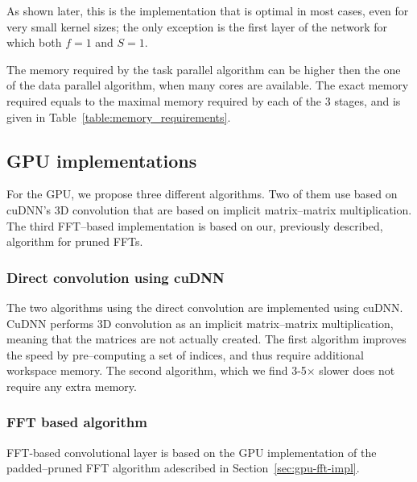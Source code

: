 \documentclass[conference]{./IEEEtran/IEEEtran}
\begin{document}
  As shown later, this is the implementation that is optimal in most
  cases, even for very small kernel sizes; the only exception is the
  first layer of the network for which both $f = 1$ and $S = 1$.

  The memory required by the task parallel algorithm can be higher
  then the one of the data parallel algorithm, when many cores are
  available.  The exact memory required equals to the maximal memory
  required by each of the 3 stages, and is given in
  Table~\ref{table:memory_requirements}.


\subsection{GPU implementations}

  For the GPU, we propose three different algorithms.  Two of them use
  based on cuDNN's 3D convolution that are based on implicit
  matrix--matrix multiplication.  The third FFT--based implementation
  is based on our, previously described, algorithm for pruned
  FFTs.

\subsubsection{Direct convolution using cuDNN}

  The two algorithms using the direct convolution are implemented
  using cuDNN.  CuDNN performs 3D convolution as an implicit
  matrix--matrix multiplication, meaning that the matrices are not
  actually created.  The first algorithm improves the speed by
  pre--computing a set of indices, and thus require additional
  workspace memory.  The second algorithm, which we find 3-5$\times$
  slower does not require any extra memory.

\subsubsection{FFT based algorithm}

  FFT-based convolutional layer is based on the GPU implementation of
  the padded--pruned FFT algorithm adescribed in
  Section~\ref{sec:gpu-fft-impl}.
\end{document}
